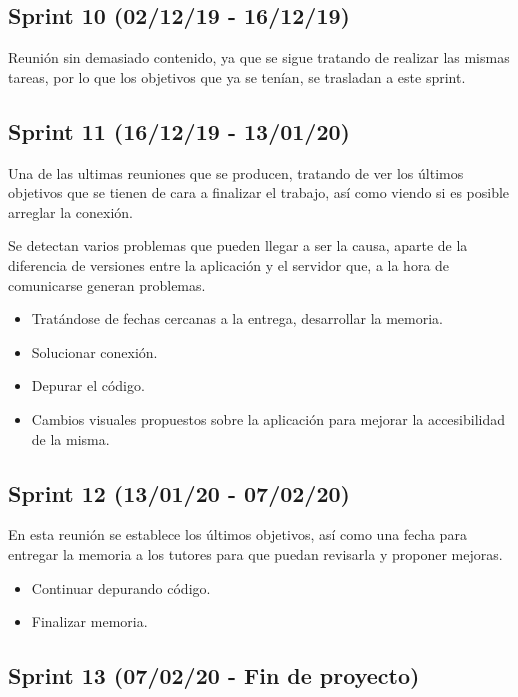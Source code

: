 \subsection{Sprint 10 (02/12/19 - 16/12/19)}

Reunión sin demasiado contenido, ya que se sigue tratando de realizar las mismas tareas, por lo que los objetivos que ya se tenían, se trasladan a este sprint.

\subsection{Sprint 11 (16/12/19 - 13/01/20)}

Una de las ultimas reuniones que se producen, tratando de ver los últimos objetivos que se tienen de cara a finalizar el trabajo, así como viendo si es posible arreglar la conexión. 

Se detectan varios problemas que pueden llegar a ser la causa, aparte de la diferencia de versiones entre la aplicación y el servidor que, a la hora de comunicarse generan problemas.

\begin{itemize}
\item Tratándose de fechas cercanas a la entrega, desarrollar la memoria.
\item Solucionar conexión.
\item Depurar el código.
\item Cambios visuales propuestos sobre la aplicación para mejorar la accesibilidad de la misma.
\end{itemize}

\subsection{Sprint 12 (13/01/20 - 07/02/20)}

En esta reunión se establece los últimos objetivos, así como una fecha para entregar la memoria a los tutores para que puedan revisarla y proponer mejoras.

\begin{itemize}
\item Continuar depurando código.
\item Finalizar memoria.
\end{itemize}

\subsection{Sprint 13 (07/02/20 - Fin de proyecto)}


